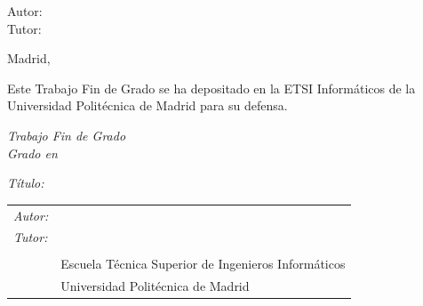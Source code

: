 \begin{titlepage}
  \vspace*{0.5cm}
  \begin{center}
    \huge\bfseries {  \TituloTFG{} }
  \end{center}

  \vspace*{5cm}

  \noindent
  \large{Autor: \NombreAutor{} }\\
  \large{Tutor: \NombreTutor{} }


  \vspace*{4cm}
  \begin{center}
    Madrid, \Fecha
  \end{center}

  \newpage
  \thispagestyle{empty}
  \noindent
  Este Trabajo Fin de Grado se ha depositado en la ETSI Informáticos de la Universidad Politécnica de Madrid para su defensa.

  \vspace*{4cm}
  \noindent
  \textit{Trabajo Fin de Grado}\\
  \textit{Grado en}\Grado{}
  
  \textit{Título:} \TituloTFG{}

  \Fecha

  \vspace*{3cm}

  \noindent
  \begin{tabular}{ll}
     \textit{Autor:} & \NombreAutor{}  \\
     \textit{Tutor:} & \NombreTutor{}  \\
     & \Departamento{} \\
     & Escuela Técnica Superior de Ingenieros Informáticos\\
     & Universidad Politécnica de Madrid
  \end{tabular}

\end{titlepage}
